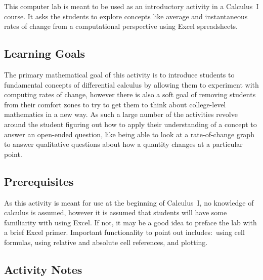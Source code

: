 




\thispagestyle{fancy} %

This computer lab is meant to be used as an introductory activity in a Calculus~I course. It asks the students to explore concepts like average and instantaneous rates of change from a computational perspective using Excel spreadsheets.

\subsection*{Learning Goals}

The primary mathematical goal of this activity is to introduce students to fundamental concepts of differential calculus by allowing them to experiment with computing rates of change, however there is also a soft goal of removing students from their comfort zones to try to get them to think about college-level mathematics in a new way. As such a large number of the activities revolve around the student figuring out how to apply their understanding of a concept to answer an open-ended question, like being able to look at a rate-of-change graph to answer qualitative questions about how a quantity changes at a particular point.

\subsection*{Prerequisites}

As this activity is meant for use at the beginning of Calculus~I, no knowledge of calculus is assumed, however it is assumed that students will have some familiarity with using Excel. If not, it may be a good idea to preface the lab with a brief Excel primer. Important functionality to point out includes:~using cell formulas, using relative and absolute cell references, and plotting.

\subsection*{Activity Notes}

